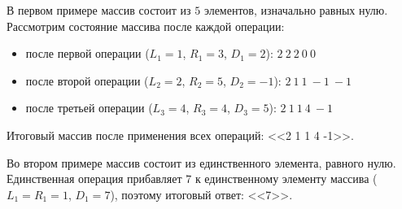 В первом примере массив состоит из $5$ элементов, изначально равных нулю. Рассмотрим состояние массива после каждой операции:

\begin{itemize}
\item после первой операции ($L_1 = 1$, $R_1 = 3$, $D_1 = 2$): $2\ 2\ 2\ 0\ 0$
\item после второй операции ($L_2 = 2$, $R_2 = 5$, $D_2 = -1$): $2\ 1\ 1\ -1\ -1$
\item после третьей операции ($L_3 = 4$, $R_3 = 4$, $D_3 = 5$): $2\ 1\ 1\ 4\ -1$
\end{itemize}

Итоговый массив после применения всех операций: <<2 1 1 4 -1>>.

Во втором примере массив состоит из единственного элемента, равного нулю. Единственная операция прибавляет $7$ к единственному элементу массива ($L_1 = R_1 = 1$, $D_1 = 7$), поэтому итоговый ответ: <<7>>.
